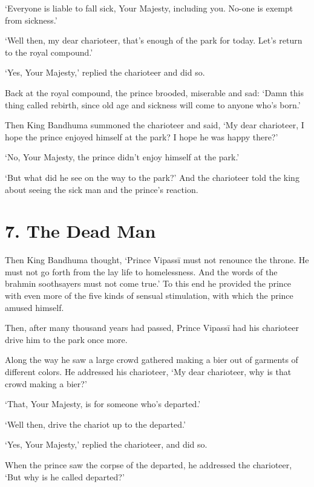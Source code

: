 \documentclass[12pt,openany]{book}%
\begin{document}
‘Everyone is liable to fall sick, Your Majesty, including you. No-one is exempt from sickness.’ 

‘Well then, my dear charioteer, that’s enough of the park for today. Let’s return to the royal compound.’ 

‘Yes, Your Majesty,’ replied the charioteer and did so. 

Back at the royal compound, the prince brooded, miserable and sad: ‘Damn this thing called rebirth, since old age and sickness will come to anyone who’s born.’ 

Then King Bandhuma summoned the charioteer and said, ‘My dear charioteer, I hope the prince enjoyed himself at the park? I hope he was happy there?’ 

‘No, Your Majesty, the prince didn’t enjoy himself at the park.’ 

‘But what did he see on the way to the park?’ And the charioteer told the king about seeing the sick man and the prince’s reaction. 

\section*{7. The Dead Man }

Then King Bandhuma thought, ‘Prince \textsanskrit{Vipassī} must not renounce the throne. He must not go forth from the lay life to homelessness. And the words of the brahmin soothsayers must not come true.’ To this end he provided the prince with even more of the five kinds of sensual stimulation, with which the prince amused himself. 

Then, after many thousand years had passed, Prince \textsanskrit{Vipassī} had his charioteer drive him to the park once more. 

Along the way he saw a large crowd gathered making a bier out of garments of different colors. He addressed his charioteer, ‘My dear charioteer, why is that crowd making a bier?’ 

‘That, Your Majesty, is for someone who’s departed.’ 

‘Well then, drive the chariot up to the departed.’ 

‘Yes, Your Majesty,’ replied the charioteer, and did so. 

When the prince saw the corpse of the departed, he addressed the charioteer, ‘But why is he called departed?’ 
\end{document}
